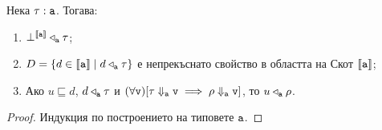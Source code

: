 \begin{lemma}\label{lem:pcf:relation}
  Нека $\tau : \texttt{a}$. Тогава:
  \begin{enumerate}[1)]
  \item
    $\bot^{\llbracket{\texttt{a}}\rrbracket} \triangleleft_{\texttt{a}} \tau$;
  \item
    $D = \{d \in \llbracket{\texttt{a}}\rrbracket \mid d \triangleleft_{\texttt{a}} \tau\}$ е непрекъснато свойство в областта на Скот $\llbracket{\texttt{a}}\rrbracket$;
  \item
    Ако $u \sqsubseteq d$, $d \triangleleft_{\texttt{a}} \tau$ и $(\forall \texttt{v})[\tau \Downarrow_{\texttt{a}} \texttt{v} \implies \rho
    \Downarrow_{\texttt{a}} \texttt{v}]$, то $u \triangleleft_{\texttt{a}} \rho$.
  \end{enumerate}
\end{lemma}
\begin{proof}
  Индукция по построението на типовете $\texttt{a}$.
  

\end{proof}
